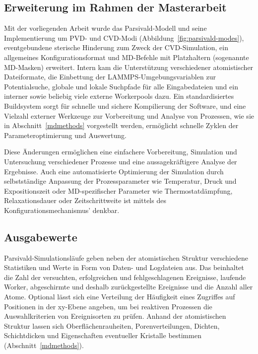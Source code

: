 \subsection{Erweiterung im Rahmen der Masterarbeit}

Mit der vorliegenden Arbeit wurde das Parsivald-Modell und seine Implementierung um PVD- und CVD-Modi (Abbildung~\ref{fig:parsivald-modes}), eventgebundene sterische Hinderung zum Zweck der CVD-Simu\-lation, ein allgemeines Konfigurationsformat und MD-Befehle mit Platzhaltern (sogenannte MD-Masken) erweitert.
Intern kam die Unterstützung verschiedener atomistischer Dateiformate, die Einbettung der LAMMPS-Umgebungs\-variablen zur Potentialsuche, globale und lokale Suchpfade für alle Eingabedateien und ein interner sowie beliebig viele externe Workerpools dazu.
Ein standardisiertes Buildsystem sorgt für schnelle und sichere Kompilierung der Software, und eine Vielzahl externer Werkzeuge zur Vorbereitung und Analyse von Prozessen, wie sie in Abschnitt~\ref{mdmethods} vorgestellt werden, ermöglicht schnelle Zyklen der Parameteroptimierung und Auswertung.

Diese Änderungen ermöglichen eine einfachere Vorbereitung, Simulation und Untersuchung verschiedener Prozesse und eine aussagekräftigere Analyse der Ergebnisse.
Auch eine automatisierte Optimierung der Simulation durch selbstständige Anpassung der Prozessparameter wie Temperatur, Druck und Expositionszeit oder MD-spezifischer Parameter wie Thermostatdämpfung, Relaxationsdauer oder Zeitschrittweite ist mittels des Konfigurationsmechanismus' denkbar.


\subsection{Ausgabewerte}

Parsivald-Simulationsläufe geben neben der atomistischen Struktur verschiedene Statistiken und Werte in Form von Daten- und Logdateien aus.
Das beinhaltet die Zahl der versuchten, erfolgreichen und fehlgeschlagenen Ereignisse, laufende Worker, abgeschirmte und deshalb zurückgestellte Ereignisse und die Anzahl aller Atome.
Optional lässt sich eine Verteilung der Häufigkeit eines Zugriffes auf Positionen in der xy-Ebene angeben, um bei reaktiven Prozessen die Auswahlkriterien von Ereignisorten zu prüfen.
Anhand der atomistischen Struktur lassen sich Oberflächenrauheiten, Porenverteilungen, Dichten, Schichtdicken und Eigenschaften eventueller Kristalle bestimmen (Abschnitt~\ref{mdmethods}).

